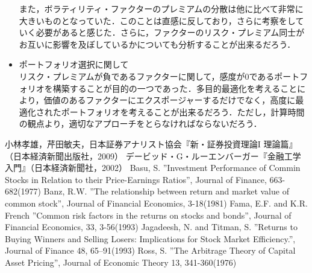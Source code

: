 ﻿\documentclass[a4paper]{jarticle}
\begin{document}
\begin{itemize}
\quad また，ボラティリティ・ファクターのプレミアムの分散は他に比べて非常に大きいものとなっていた．このことは直感に反しており，さらに考察をしていく必要があると感じた．さらに，ファクターのリスク・プレミアム同士がお互いに影響を及ぼしているかについても分析することが出来るだろう．

\item{ポートフォリオ選択に関して}\\
\quad リスク・プレミアムが負であるファクターに関して，感度が0であるポートフォリオを構築することが目的の一つであった．多目的最適化を考えることにより，価値のあるファクターにエクスポージャーするだけでなく，高度に最適化されたポートフォリオを考えることが出来るだろう．ただし，計算時間の観点より，適切なアプローチをとらなければならないだろう．


\end{itemize}

\newpage

\begin{thebibliography}{30}
	 小林孝雄，芹田敏夫，日本証券アナリスト協会『新・証券投資理論I 理論篇』（日本経済新聞出版社，2009）
	 デービッド・G・ルーエンバーガー『金融工学入門』（日本経済新聞社，2002）
	 Basu, S. ''Investment Performance of Commin Stocks in Relation to their Price-Earnings Ratios'', Journal of Finance, 663-682(1977)
	 Banz, R.W. ''The relationship between return and market value of common stock'', Journal of Financial Economics, 3-18(1981)
	 Fama, E.F. and K.R. French ''Common risk factors in the returns on stocks and bonds'', Journal of Financial Economics, 33, 3-56(1993)
	 Jagadeesh, N. and Titman, S. ''Returns to Buying Winners and Selling Losers: Implications for Stock Market Efficiency.'', Journal of Finance 48, 65–91(1993)
	 Ross, S. ''The Arbitrage Theory of Capital Asset Pricing'', Journal of Economic Theory 13, 341-360(1976)
	
\end{thebibliography}
\end{document}
